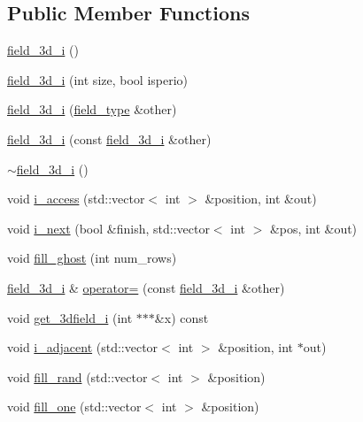 \subsection*{Public Member Functions}
\begin{DoxyCompactItemize}
\item 
\hyperlink{classfield__3d__i_a1100cc58d17fcd3edc299d7fb3827b52}{field\+\_\+3d\+\_\+i} ()
\item 
\hyperlink{classfield__3d__i_aa4581cb848c05c9f0492cab5890a706b}{field\+\_\+3d\+\_\+i} (int size, bool isperio)
\item 
\hyperlink{classfield__3d__i_a66200c76ee712977025a7f69d66c375c}{field\+\_\+3d\+\_\+i} (\hyperlink{classfield__type}{field\+\_\+type} \&other)
\item 
\hyperlink{classfield__3d__i_afa1312b43ab3aa34685d4bf5a0d5ce9a}{field\+\_\+3d\+\_\+i} (const \hyperlink{classfield__3d__i}{field\+\_\+3d\+\_\+i} \&other)
\item 
\hyperlink{classfield__3d__i_a34b2bea2d2d2375cafb18a42963e037d}{$\sim$field\+\_\+3d\+\_\+i} ()
\item 
void \hyperlink{classfield__3d__i_abe65be5385f05e22ae373414113229bf}{i\+\_\+access} (std\+::vector$<$ int $>$ \&position, int \&out)
\item 
void \hyperlink{classfield__3d__i_a5cd3d146e8596ab6894f3f64bdad66e7}{i\+\_\+next} (bool \&finish, std\+::vector$<$ int $>$ \&pos, int \&out)
\item 
void \hyperlink{classfield__3d__i_a5c7a0ce8daedd401bdd8c6c57bd5343c}{fill\+\_\+ghost} (int num\+\_\+rows)
\item 
\hyperlink{classfield__3d__i}{field\+\_\+3d\+\_\+i} \& \hyperlink{classfield__3d__i_a1f8a8ea350fcc5c653655fde60d8ab90}{operator=} (const \hyperlink{classfield__3d__i}{field\+\_\+3d\+\_\+i} \&other)
\item 
void \hyperlink{classfield__3d__i_ac81c2d9860241c803182c3bab9cc46e3}{get\+\_\+3dfield\+\_\+i} (int $\ast$$\ast$$\ast$\&x) const 
\item 
void \hyperlink{classfield__3d__i_ab004d49b6e1494af59307312b772e7e9}{i\+\_\+adjacent} (std\+::vector$<$ int $>$ \&position, int $\ast$out)
\item 
void \hyperlink{classfield__3d__i_a014cb8a3b6feb90c7af771960b53fda7}{fill\+\_\+rand} (std\+::vector$<$ int $>$ \&position)
\item 
void \hyperlink{classfield__3d__i_a3500aa4597707f620d1c2f4a51936faa}{fill\+\_\+one} (std\+::vector$<$ int $>$ \&position)
\item 

\end{DoxyCompactItemize}
